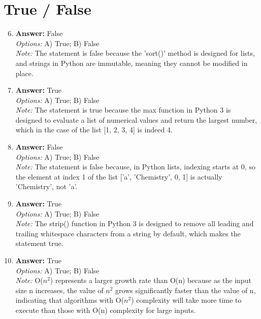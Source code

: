\documentclass[12pt]{article}
\begin{document}
\section*{True / False}
\begin{enumerate}[label=\arabic*.]
\setcounter{enumi}{5}
\item \textbf{Answer:} False
\\ \textit{Options:} A) True; B) False
\\ \textit{Note:} The statement is false because the 'sort()' method is designed for lists, and strings in Python are immutable, meaning they cannot be modified in place.
\item \textbf{Answer:} True
\\ \textit{Options:} A) True; B) False
\\ \textit{Note:} The statement is true because the max function in Python 3 is designed to evaluate a list of numerical values and return the largest number, which in the case of the list [1, 2, 3, 4] is indeed 4.
\item \textbf{Answer:} False
\\ \textit{Options:} A) True; B) False
\\ \textit{Note:} The statement is false because, in Python lists, indexing starts at 0, so the element at index 1 of the list ['a', 'Chemistry', 0, 1] is actually 'Chemistry', not 'a'.
\item \textbf{Answer:} True
\\ \textit{Options:} A) True; B) False
\\ \textit{Note:} The strip() function in Python 3 is designed to remove all leading and trailing whitespace characters from a string by default, which makes the statement true.
\item \textbf{Answer:} True
\\ \textit{Options:} A) True; B) False
\\ \textit{Note:} O($n^2$) represents a larger growth rate than O(n) because as the input size n increases, the value of $n^2$ grows significantly faster than the value of n, indicating that algorithms with O($n^2$) complexity will take more time to execute than those with O(n) complexity for large inputs.
\end{enumerate}
\end{document}

